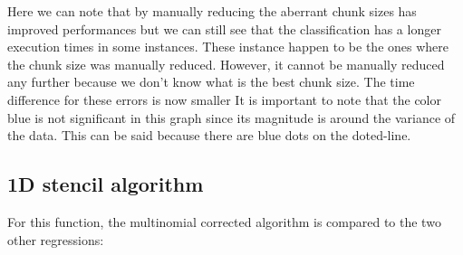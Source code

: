Here we can note that by manually reducing the aberrant chunk sizes has improved performances but we can still see that the classification has  a longer execution times in some instances. These instance happen to be the ones where the chunk size was manually reduced. However, it cannot be manually reduced any further because we don't know what is the best chunk size. The time difference for these errors is now smaller It is important to note that the color blue is not significant in this graph since its magnitude is around the variance of the data. This can be said because there are blue dots on the doted-line.
\subsection{1D stencil algorithm}
For this function, the multinomial corrected algorithm is compared to the two other regressions:

